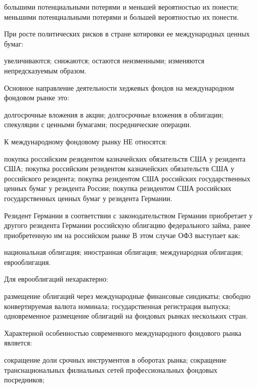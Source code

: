 \documentclass[12pt, table]{exam}
\begin{document}
\begin{questions}
\begin{multicols}{2}
\begin{choices}
	 \CC большими потенциальными потерями и меньшей вероятностью их понести;
	 \choice меньшими потенциальными потерями и большей вероятностью их понести.
	 \end{choices}
\question  При росте политических рисков в стране котировки ее международных ценных бумаг:
	 \begin{choices}
	 \choice увеличиваются;
	 \CC снижаются;
	 \choice остаются неизменными;
	 \choice изменяются непредсказуемым образом.
	 \end{choices}
\question  Основное направление деятельности хеджевых фондов на международном фондовом рынке это:
	 \begin{choices}
	 \choice долгосрочные вложения в акции;
	 \choice долгосрочные вложения в облигации;
	 \CC спекуляции с ценными бумагами;
	 \choice посреднические операции.
	 \end{choices}
\question  К международному фондовому рынку НЕ относятся:
	 \begin{choices}
	 \choice покупка российским резидентом казначейских обязательств США у резидента США;
	 \CC покупка российским резидентом казначейских обязательств США у российского резидента;
	 \choice покупка резидентом США российских государственных ценных бумаг у резидента России;
	 \choice покупка резидентом США российских государственных ценных бумаг у резидента Германии.
	 \end{choices}
\question  Резидент Германии в соответствии с законодательством Германии приобретает у другого резидента Германии российскую облигацию федерального займа, ранее приобретенную им на российском рынке В этом случае ОФЗ выступает как:
	 \begin{choices}
	 \choice национальная облигация;
	 \CC иностранная облигация;
	 \choice международная облигация;
	 \choice еврооблигация.
	 \end{choices}
\question  Для еврооблигаций нехарактерно:
	 \begin{choices}
	 \choice размещение облигаций через международные финансовые синдикаты;
	 \choice свободно конвертируемая валюта номинала;
	 \CC государственная регистрация выпуска;
	 \choice одновременное размещение облигаций на фондовых рынках нескольких стран.
	 \end{choices}
\question  Характерной особенностью современного международного фондового рынка является:
	 \begin{choices}
	 \choice сокращение доли срочных инструментов в оборотах рынка;
	 \choice сокращение транснациональных филиальных сетей профессиональных фондовых посредников;

\end{choices}
\end{multicols}
\end{questions}
\end{document}
